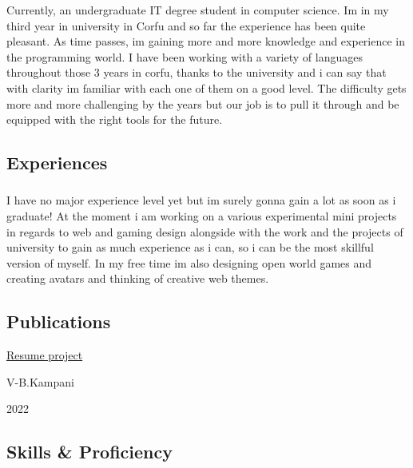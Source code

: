 \documentclass[english,]{article}
\begin{document}
Currently, an undergraduate IT degree student in computer science. Im in
my third year in university in Corfu and so far the experience has been
quite pleasant. As time passes, im gaining more and more knowledge and
experience in the programming world. I have been working with a variety
of languages throughout those 3 years in corfu, thanks to the university
and i can say that with clarity im familiar with each one of them on a
good level. The difficulty gets more and more challenging by the years
but our job is to pull it through and be equipped with the right tools
for the future.

\hypertarget{experiences}{%
\subsection{\texorpdfstring{{ \emph{} \emph{} }
Experiences}{    Experiences}}\label{experiences}}

\hypertarget{section-2}{%
\subsubsection{}\label{section-2}}

I have no major experience level yet but im surely gonna gain a lot as
soon as i graduate! At the moment i am working on a various experimental
mini projects in regards to web and gaming design alongside with the
work and the projects of university to gain as much experience as i can,
so i can be the most skillful version of myself. In my free time im also
designing open world games and creating avatars and thinking of creative
web themes.

\hypertarget{publications}{%
\subsection{\texorpdfstring{{ \emph{} \emph{} }
Publications}{    Publications}}\label{publications}}

\href{https://vasiliskampani.github.io/online-cv/}{Resume project}

V-B.Kampani

2022

\hypertarget{skills-proficiency}{%
\subsection{\texorpdfstring{{ \emph{} \emph{} } Skills \&
Proficiency}{    Skills \& Proficiency}}\label{skills-proficiency}}
\end{document}
